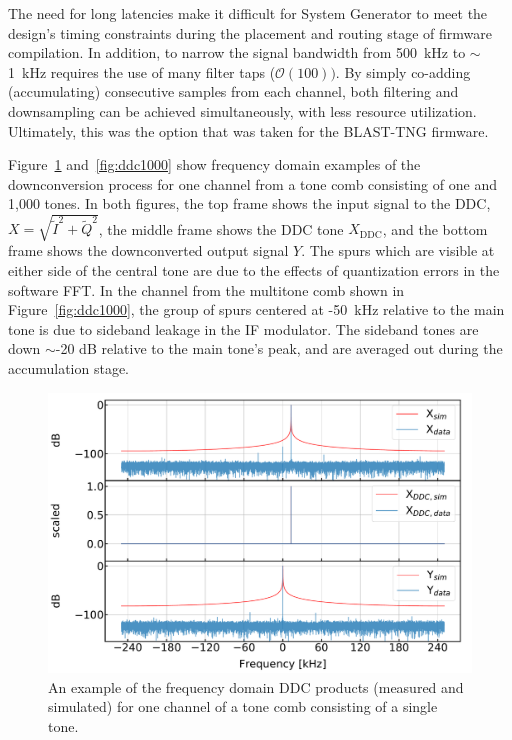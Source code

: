 The need for long latencies make it difficult for System Generator to meet the design's timing constraints during the placement and routing stage of firmware compilation. In addition, to narrow the signal bandwidth from 500~kHz to $\sim$1~kHz requires the use of many filter taps ($\mathcal{O}(100))$. By simply co-adding (accumulating) consecutive samples from each channel, both filtering and downsampling can be achieved simultaneously, with less resource utilization. Ultimately, this was the option that was taken for the BLAST-TNG firmware.

Figure~\ref{fig:ddc1} and~\ref{fig:ddc1000} show frequency domain examples of the downconversion process for one channel from a tone comb consisting of one and 1,000 tones. In both figures, the top frame shows the input signal to the DDC, $X = \sqrt{\widetilde{I}^{2} + \widetilde{Q}^{2}}$, the middle frame shows the DDC tone $X_{\mathrm{DDC}}$, and the bottom frame shows the downconverted output signal $Y$. The spurs which are visible at either side of the central tone are due to the effects of quantization errors in the software FFT\@. In the channel from the multitone comb shown in Figure~\ref{fig:ddc1000}, the group of spurs centered at -50~kHz relative to the main tone is due to sideband leakage in the IF modulator. The sideband tones are down $\sim$-20 dB relative to the main tone's peak, and are averaged out during the accumulation stage.

\begin{figure}[!htbp]
\centering
\includegraphics[width=\textwidth]{figures/readout/sim/ddc_sim_0}
\caption[~An example of the frequency domain DDC products (measured and simulated) for one channel of a tone comb consisting of a single tone.]{An example of the frequency domain DDC products (measured and simulated) for one channel of a tone comb consisting of a single tone.}
\label{fig:ddc1}
\end{figure}

